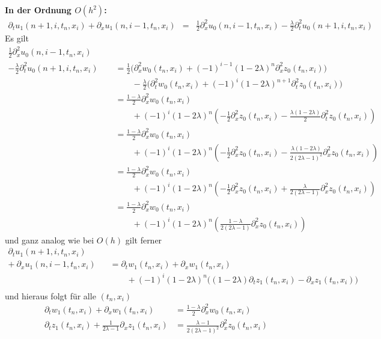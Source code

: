 \vspace{0.4cm}
\noindent \textbf{In der Ordnung $O(h^2)$:}
\begin{align*}
\partial_t u_1(n+1, i, t_n, x_i) + \partial_x u_1(n, i-1, t_n, x_i) &=
&\frac {1}{2} \partial^2_x u_0(n, i-1, t_n, x_i) - \frac{\lambda}{2} \partial^2_t u_0(n+1, i, t_n, x_i)
\end{align*}
Es gilt 
\begin{align*}
\frac {1}{2} \partial^2_x u_0(n, i-1, t_n, x_i) \qquad\\
- \frac{\lambda}{2} \partial^2_t u_0(n+1, i, t_n, x_i)
&= \frac{1}{2} \bigl( \partial^2_x w_0(t_n, x_i) + (-1)^{i-1} (1 - 2\lambda)^n \partial^2_x z_0(t_n, x_i) \bigr) \\
&\qquad - \frac{\lambda}{2} \bigl( \partial^2_t w_0(t_n, x_i) + (-1)^i (1 - 2\lambda)^{n+1} \partial^2_t z_0(t_n, x_i) \bigr)\\
&= \frac{1 - \lambda}{2}  \partial^2_x w_0(t_n, x_i)\\
&\qquad + (-1)^i (1 - 2\lambda)^{n} \left( - \frac{1}{2} \partial^2_x z_0(t_n, x_i) - \frac{\lambda (1 - 2\lambda)}{2} \partial^2_t z_0(t_n, x_i) \right)\\
&= \frac{1 - \lambda}{2}  \partial^2_x w_0(t_n, x_i)\\
&\qquad + (-1)^i (1 - 2\lambda)^{n} \left( - \frac{1}{2} \partial^2_x z_0(t_n, x_i) - \frac{\lambda (1 - 2\lambda)}{2 (2 \lambda - 1)^2} \partial^2_x z_0(t_n, x_i) \right)\\
&= \frac{1 - \lambda}{2}  \partial^2_x w_0(t_n, x_i)\\
&\qquad + (-1)^i (1 - 2\lambda)^{n} \left( - \frac{1}{2} \partial^2_x z_0(t_n, x_i) + \frac{\lambda}{2 (2 \lambda - 1)} \partial^2_x z_0(t_n, x_i) \right)\\
&= \frac{1 - \lambda}{2}  \partial^2_x w_0(t_n, x_i)\\
&\qquad + (-1)^i (1 - 2\lambda)^{n} \left( \frac{1 - \lambda}{2 (2 \lambda - 1)} \partial^2_x z_0(t_n, x_i) \right)
\end{align*}
und ganz analog wie bei $O(h)$ gilt ferner
\begin{align*}
\partial_t u_1(n+1, i, t_n, x_i) \qquad\\
+ \: \partial_x u_1(n, i-1, t_n, x_i) &= \partial_t w_1(t_n, x_i) + \partial_x w_1(t_n, x_i)\\
&\qquad + (-1)^i (1 - 2\lambda)^n \bigl( (1 - 2\lambda) \partial_t z_1(t_n, x_i) - \partial_x z_1(t_n, x_i) \bigr) \\
\end{align*}
und hieraus folgt für alle $(t_n, x_i)$
\begin{align*}
\partial_t w_1(t_n, x_i) + \partial_x w_1(t_n, x_i) &= \frac{1 - \lambda}{2}  \partial^2_x w_0(t_n, x_i)\\
\partial_t z_1(t_n, x_i) + \frac{1}{2 \lambda - 1} \partial_x z_1(t_n, x_i) &= \frac{\lambda - 1}{2 (2 \lambda - 1)^2} \partial^2_x z_0(t_n, x_i)
\end{align*}